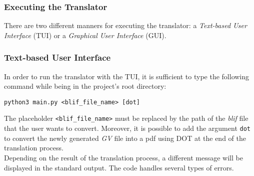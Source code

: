 \documentclass[]{usiinfbachelorproject}
\begin{document}
\subsubsection{Executing the Translator}\label{subsubsec:executing-translator}
There are two different manners for executing the translator: a \textit{Text-based User Interface} (TUI) or a \textit{Graphical User Interface} (GUI).
\subsubsection*{Text-based User Interface}
In order to run the translator with the TUI, it is sufficient to type the following command while being in the project's root directory:
\begin{center}
    \texttt{python3 main.py <blif\_file\_name> [dot]}
\end{center}
The placeholder \texttt{<blif\_file\_name>} must be replaced by the path of the \textit{blif} file that the user wants to convert. Moreover, it is possible to add the argument \texttt{dot} to convert the newly generated \textit{GV} file into a pdf using DOT at the end of the translation process. \\
Depending on the result of the translation process, a different message will be displayed in the standard output. The code handles several types of errors. 
\end{document}
